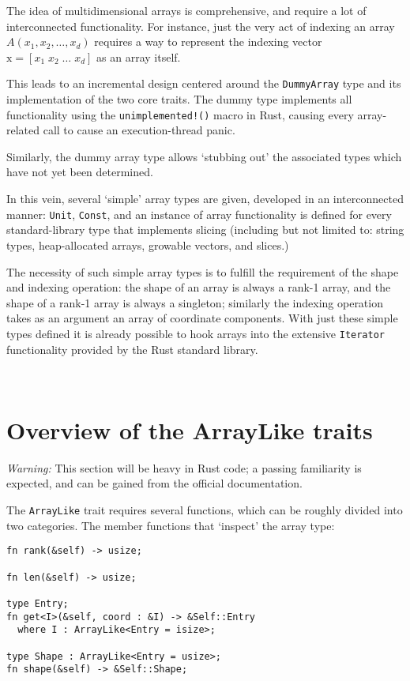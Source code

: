 \documentclass{DIKU-report-variant}
\newcommand\mrm[1]{\mathrm{#1}}
\newcommand\brm[1]{\bm{\mrm{#1}}}
\begin{document}
The idea of multidimensional arrays is comprehensive, and require a lot of interconnected functionality.
For instance, just the very act of indexing an array \(A(x_1, x_2, \dots, x_d)\) requires a way to represent
the indexing vector \(\brm x = [x_1\; x_2\; \dots\;x_d]\) as an array itself.

This leads to an incremental design centered around the \texttt{DummyArray} type and its implementation of
the two core traits. The dummy type implements all functionality using the \texttt{unimplemented!()} macro
in Rust, causing every array-related call to cause an execution-thread panic.

Similarly, the dummy array type allows `stubbing out' the associated types which have not yet been determined.

In this vein, several `simple' array types are given, developed in an interconnected manner: \texttt{Unit},
\texttt{Const}, and an instance of array functionality is defined for every standard-library type that implements slicing
(including but not limited to: string types, heap-allocated arrays, growable vectors, and slices.)

The necessity of such simple array types is to fulfill the requirement of the shape and indexing operation: the
shape of an array is always a rank-1 array, and the shape of a rank-1 array is always a singleton; similarly
the indexing operation takes as an argument an array of coordinate components. With just these simple types defined
it is already possible to hook arrays into the extensive \texttt{Iterator} functionality provided by the Rust
standard library.

\

\section{Overview of the ArrayLike traits}

\textit{Warning:} This section will be heavy in Rust code; a passing familiarity is expected, and can
be gained from the official documentation\cite{RDOC117}.

The \texttt{ArrayLike} trait requires several functions, which can be roughly divided into two categories.
The member functions that `inspect' the array type:

\begin{lstlisting}
fn rank(&self) -> usize;

fn len(&self) -> usize;

type Entry;
fn get<I>(&self, coord : &I) -> &Self::Entry
  where I : ArrayLike<Entry = isize>;

type Shape : ArrayLike<Entry = usize>;
fn shape(&self) -> &Self::Shape;
\end{lstlisting}
\end{document}
